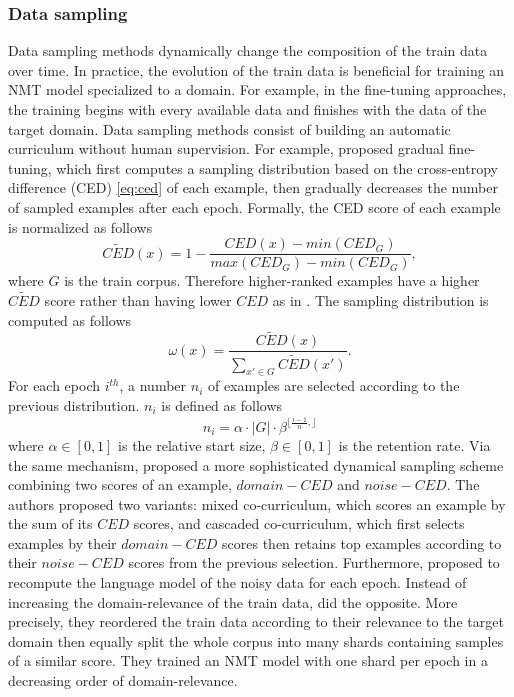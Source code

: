 \subsubsection{Data sampling}

Data sampling methods dynamically change the composition of the train data over time. In practice, the evolution of the train data is beneficial for training an NMT model specialized to a domain. For example, in the fine-tuning approaches, the training begins with every available data and finishes with the data of the target domain. Data sampling methods consist of building an automatic curriculum without human supervision. For example, \citet{Wees17dynamic} proposed gradual fine-tuning, which first computes a sampling distribution based on the cross-entropy difference (CED) \eqref{eq:ced} of each example, then gradually decreases the number of sampled examples after each epoch. Formally, the CED score of each example is normalized as follows
\begin{equation}
\tilde{CED}(x) = 1 - \frac{CED(x)-min(CED_{G})}{max(CED_{G}) - min(CED_{G})},
\end{equation}
where $G$ is the train corpus. Therefore higher-ranked examples have a higher $\tilde{CED}$ score rather than having lower $CED$ as in \citet{Axelrod11domain}. The sampling distribution is computed as follows
\begin{equation}
\omega(x) = \frac{\tilde{CED}(x)}{\sum_{x'\in G} \tilde{CED}(x')}.
\end{equation}
For each epoch $i^{th}$, a number $n_i$ of examples are selected according to the previous distribution. $n_i$ is defined as follows
\begin{equation}
n_i = \alpha \cdot |G| \cdot \beta^{\lfloor \frac{i-1}{n}, \rfloor}
\end{equation}
where $\alpha \in [0,1]$ is the relative start size, $\beta \in [0,1]$ is the retention rate. Via the same mechanism, \citet{Wang19dynamically} proposed a more sophisticated dynamical sampling scheme combining two scores of an example, $domain-CED$ and $noise-CED$. The authors proposed two variants: mixed co-curriculum, which scores an example by the sum of its $CED$ scores, and cascaded co-curriculum, which first selects examples by their $domain-CED$ scores then retains top examples according to their $noise-CED$ scores from the previous selection. Furthermore, \citet{Wang19dynamically} proposed to recompute the language model of the noisy data for each epoch. Instead of increasing the domain-relevance of the train data, \citet{Zhang19curriculum} did the opposite. More precisely, they reordered the train data according to their relevance to the target domain then equally split the whole corpus into many shards containing samples of a similar score. They trained an NMT model with one shard per epoch in a decreasing order of domain-relevance.

